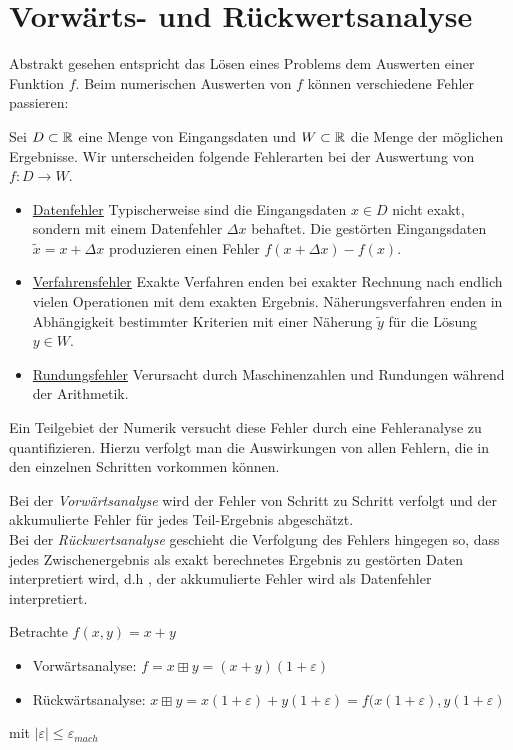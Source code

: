 \section{Vorwärts- und Rückwertsanalyse}
Abstrakt gesehen entspricht das Lösen eines Problems dem Auswerten einer Funktion $f$.
Beim numerischen Auswerten von $f$ können verschiedene Fehler passieren:

\begin{definition}[Fehlerarten]
Sei $D \subset \mathbb{R}$ eine Menge von Eingangsdaten und $W \subset \mathbb{R}$ die Menge der möglichen Ergebnisse. Wir unterscheiden folgende Fehlerarten bei der Auswertung von $f \colon D \to W$.
\begin{itemize}
\item \underline{Datenfehler} Typischerweise sind die Eingangsdaten $x \in D$ nicht exakt,
sondern mit einem Datenfehler $\Delta x$ behaftet. Die gestörten Eingangsdaten $\tilde{x}=x+ \Delta x$ produzieren einen Fehler $f(x+\Delta x)-f(x)$.
\item \underline{Verfahrensfehler} Exakte Verfahren enden bei exakter Rechnung nach endlich vielen Operationen mit dem exakten Ergebnis.
Näherungsverfahren enden in Abhängigkeit bestimmter Kriterien mit einer Näherung $\tilde{y}$ für die Lösung $y \in W$.
\item \underline{Rundungsfehler} Verursacht durch Maschinenzahlen und Rundungen während der Arithmetik.
\end{itemize}
\end{definition}
Ein Teilgebiet der Numerik versucht diese Fehler durch eine Fehleranalyse zu quantifizieren.
Hierzu verfolgt man die Auswirkungen von allen Fehlern, die in den einzelnen Schritten vorkommen können.
\begin{definition}[Analysearten]
Bei der \emph{Vorwärtsanalyse} wird der Fehler von Schritt zu Schritt verfolgt und der akkumulierte Fehler für jedes Teil-Ergebnis abgeschätzt. \\
Bei der \emph{Rückwertsanalyse} geschieht die Verfolgung des Fehlers hingegen so, dass jedes Zwischenergebnis als exakt berechnetes Ergebnis zu gestörten Daten interpretiert wird, d.h , der akkumulierte Fehler wird als Datenfehler interpretiert.
\end{definition}
\begin{example}
Betrachte $f(x,y)=x+y$ \\
\begin{itemize}
	\item Vorwärtsanalyse: $\boxed{f} = x \boxplus y= (x+y)(1+\varepsilon)$
	\item Rückwärtsanalyse: $x \boxplus y= x(1+\varepsilon)+y(1+\varepsilon)= f(x(1+\varepsilon), y(1+\varepsilon)$
\end{itemize}
mit $|\varepsilon|\le \varepsilon_{mach}$
\end{example}
